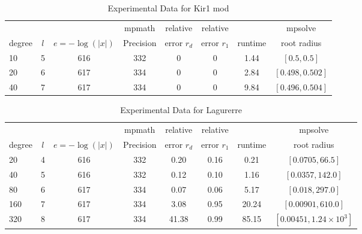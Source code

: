 \documentclass[sigconf]{acmart}
\begin{document}
\begin{table}[t]
\caption{Experimental Data for Kir1 mod}
\label{tab:kir1_mod}
\vskip -0.15in
\begin{center}
\begin{small}
\begin{sc}
\begin{tabular}{lccccccc}
\toprule
&  &  & mpmath & relative  & relative &  & mpsolve \\
degree  & $l$& $e=-\log(|x|)$& Precision &error $r_d$       & error $r_1$ &runtime& root radius\\
\midrule
   10 & 5 & 616 & 332 & 0 & 0 & 1.44 & $[0.5, 0.5]$\\
   20 & 6 & 617 & 334 & 0 & 0 & 2.84 & $[0.498, 0.502]$\\
   40 & 7 & 617 & 334 & 0 & 0 & 9.84 & $[0.496, 0.504]$\\
\bottomrule
\end{tabular}
\end{sc}
\end{small}
\end{center}
\vskip 0.05in
\end{table}


\begin{table}[t]
\caption{Experimental Data for  Lagurerre }
\label{tab:lagurerre}
\vskip -0.15in
\begin{center}
\begin{small}
\begin{sc}
\begin{tabular}{lccccccc}
\toprule
&  &  & mpmath & relative  & relative &  & mpsolve \\
degree  & $l$& $e=-\log(|x|)$& Precision &error $r_d$       & error $r_1$ &runtime& root radius\\
\midrule
   20 & 4 & 616 & 332 & 0.20 & 0.16 & 0.21 & $[0.0705,66.5]$ \\
   40 & 5 & 616 & 332 & 0.12 & 0.10 & 1.16 & $[0.0357,142.0]$\\
   80 & 6 & 617 & 334 & 0.07 & 0.06 & 5.17 & $[0.018,297.0]$\\
 160 & 7 & 617 & 334 & 3.08 & 0.95 & 20.24 & $[0.00901,610.0]$\\
 320 & 8 & 617 & 334 & 41.38 & 0.99 & 85.15 & $[0.00451,1.24 \times 10^3]$\\
\bottomrule
\end{tabular}
\end{sc}
\end{small}
\end{center}
\vskip 0.05in
\end{table}
\end{document}
